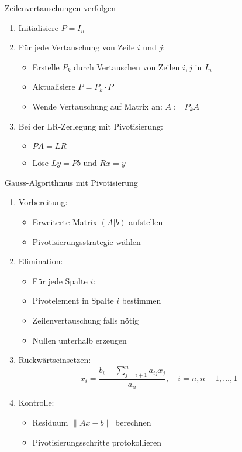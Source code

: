 \begin{KR}{Zeilenvertauschungen verfolgen}
\begin{enumerate}
    \item Initialisiere $P = I_n$
    \item Für jede Vertauschung von Zeile $i$ und $j$:
    \begin{itemize}
        \item Erstelle $P_k$ durch Vertauschen von Zeilen $i,j$ in $I_n$
        \item Aktualisiere $P = P_k \cdot P$
        \item Wende Vertauschung auf Matrix an: $A := P_kA$
    \end{itemize}
    \item Bei der LR-Zerlegung mit Pivotisierung:
    \begin{itemize}
        \item $PA = LR$ 
        \item Löse $Ly = Pb$ und $Rx = y$
    \end{itemize}
\end{enumerate}
\end{KR}

\begin{KR}{Gauss-Algorithmus mit Pivotisierung}
\begin{enumerate}
    \item Vorbereitung:
    \begin{itemize}
        \item Erweiterte Matrix $(A|b)$ aufstellen
        \item Pivotisierungsstrategie wählen
    \end{itemize}
    
    \item Elimination:
    \begin{itemize}
        \item Für jede Spalte $i$:
        \item Pivotelement in Spalte $i$ bestimmen
        \item Zeilenvertauschung falls nötig
        \item Nullen unterhalb erzeugen
    \end{itemize}
    
    \item Rückwärtseinsetzen:
    $$x_i = \frac{b_i - \sum_{j=i+1}^n a_{ij}x_j}{a_{ii}}, \quad i=n,n-1,\ldots,1$$
    
    \item Kontrolle:
    \begin{itemize}
        \item Residuum $\|Ax-b\|$ berechnen
        \item Pivotisierungsschritte protokollieren
    \end{itemize}
\end{enumerate}
\end{KR}

